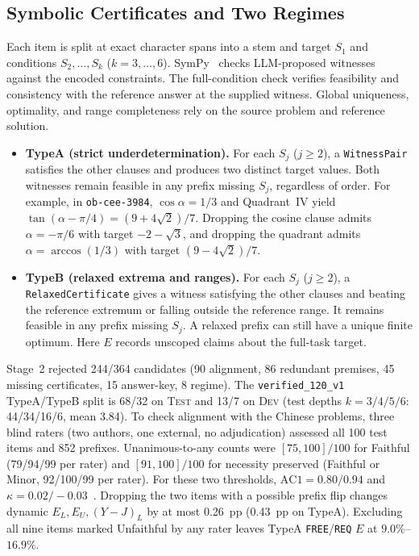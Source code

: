 \documentclass[conference,letterpaper,10pt]{IEEEtran}
\newcommand{\pFREE}{\texttt{FREE}}
\newcommand{\pREQ}{\texttt{REQ}}
\newcommand{\TA}{TypeA}
\newcommand{\TB}{TypeB}
\begin{document}
\subsection{Symbolic Certificates and Two Regimes}
Each item is split at exact character spans into a stem and target $S_1$ and conditions $S_2,\ldots,S_k$ ($k=3,\ldots,6$). SymPy~\cite{ref19} checks LLM-proposed witnesses against the encoded constraints. The full-condition check verifies feasibility and consistency with the reference answer at the supplied witness. Global uniqueness, optimality, and range completeness rely on the source problem and reference solution.
\begin{itemize}
    \item \textbf{\TA{} (strict underdetermination).} For each $S_j$ ($j\ge2$), a \texttt{WitnessPair} satisfies the other clauses and produces two distinct target values. Both witnesses remain feasible in any prefix missing $S_j$, regardless of order. For example, in \texttt{ob-cee-3984}, $\cos\alpha{=}1/3$ and Quadrant~IV yield $\tan(\alpha{-}\pi/4){=}(9{+}4\sqrt2)/7$. Dropping the cosine clause admits $\alpha{=}{-}\pi/6$ with target $-2{-}\sqrt3$, and dropping the quadrant admits $\alpha{=}\arccos(1/3)$ with target $(9{-}4\sqrt2)/7$.
    \item \textbf{\TB{} (relaxed extrema and ranges).} For each $S_j$ ($j\ge2$), a \texttt{RelaxedCertificate} gives a witness satisfying the other clauses and beating the reference extremum or falling outside the reference range. It remains feasible in any prefix missing $S_j$. A relaxed prefix can still have a unique finite optimum. Here $E$ records unscoped claims about the full-task target.
\end{itemize}

Stage~2 rejected 244/364 candidates (90 alignment, 86 redundant premises, 45 missing certificates, 15 answer-key, 8 regime). The \texttt{verified\_120\_v1} \TA/\TB{} split is 68/32 on \textsc{Test} and 13/7 on \textsc{Dev} (test depths $k{=}3/4/5/6$: 44/34/16/6, mean 3.84). To check alignment with the Chinese problems, three blind raters (two authors, one external, no adjudication) assessed all 100 test items and 852 prefixes. Unanimous-to-any counts were $[75,100]/100$ for Faithful (79/94/99 per rater) and $[91,100]/100$ for necessity preserved (Faithful or Minor, 92/100/99 per rater). For these two thresholds, $\mathrm{AC1}{=}0.80/0.94$ and $\kappa{=}0.02/{-}0.03$~\cite{ref20}. Dropping the two items with a possible prefix flip changes dynamic $E_L,E_U,(Y{-}J)_L$ by at most 0.26~pp (0.43~pp on \TA). Excluding all nine items marked Unfaithful by any rater leaves \TA{} \pFREE/\pREQ{} $E$ at $9.0\%$--$16.9\%$.
\end{document}

